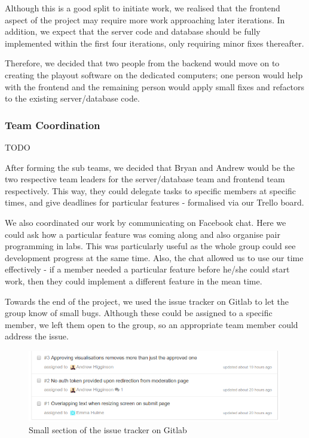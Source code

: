 \documentclass[a4paper, titlepage]{article}
\begin{document}
Although this is a good split to initiate work, we realised that the frontend 
aspect of the project may require more work approaching later iterations.
In addition, we expect that the server code and database should be fully 
implemented within the first four iterations, only requiring minor fixes thereafter.

Therefore, we decided that two people from the backend would move on to creating
the playout software on the dedicated computers; one person would help with the
frontend and the remaining person would apply small fixes and refactors to the
existing server/database code.

\subsubsection{Team Coordination}
TODO

After forming the sub teams, we decided that Bryan and Andrew would be the two respective team 
leaders for the server/database team and frontend team respectively. This way, they could delegate 
tasks to specific members at specific times, and give deadlines for particular features - formalised 
via our Trello board.

We also coordinated our work by communicating on Facebook chat. Here we could ask how a particular 
feature was coming along and also organise pair programming in labs. This was particularly useful as 
the whole group could see development progress at the same time. Also, the chat allowed us to use our 
time effectively - if a member needed a particular feature before he/she could start work, then they
could implement a different feature in the mean time. 

Towards the end of the project, we used the issue tracker on Gitlab to let the group know of small bugs.
Although these could be assigned to a specific member, we left them open to the group, so an
appropriate team member could address the issue. 

\begin{figure}[h!]
  \centering
    \includegraphics[width = 0.99\textwidth]{./projman/issue_page.png}
  \caption{Small section of the issue tracker on Gitlab}
  \label{fig:projman_issues}
\end{figure}
\end{document}
